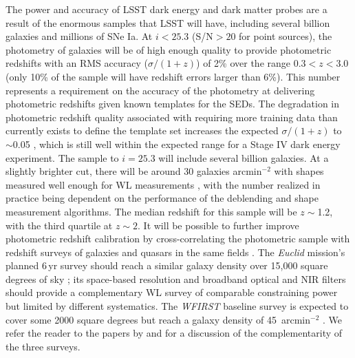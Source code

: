 The power and accuracy of LSST dark energy and dark matter probes are
a result of the enormous samples that LSST will have, including
several billion galaxies and millions of SNe Ia.
At $i < 25.3$ (S/N${}>20$ for point sources), the
photometry of galaxies will be of high enough quality to provide
photometric redshifts with an RMS accuracy ($\sigma/(1+z)$) of 2\%
over the range $0.3 < z < 3.0$ (only 10\% of the sample will have redshift errors larger than 6\%).
This number represents a requirement on the accuracy of the photometry at delivering photometric
redshifts given known templates for the SEDs.  The degradation in photometric redshift quality associated with
requiring more training data than currently exists to define the template set increases the
expected $\sigma/(1+z)$ to $\sim$0.05 \cite[e.g.][]{2015APh....63...81N,2018AJ....155....1G}, which is still well within the
expected range for a Stage IV dark energy experiment.  The
sample to $i=25.3$ will include several billion galaxies.  At a
slightly brighter cut, there will be around 30 galaxies arcmin$^{-2}$
with shapes measured well enough for WL measurements \citep{2013MNRAS.434.2121C,2015MNRAS.447.1746C},
with the number realized in practice being dependent on
the performance of the deblending and shape measurement algorithms.
The median redshift for
this sample will be $z\sim$1.2, with the third quartile at $z\sim2$.
It will be possible to further improve photometric redshift calibration
by cross-correlating the photometric sample with redshift surveys of
galaxies and quasars in the same fields
\citep{2008ApJ...684...88N,2010ApJ...721..456M,2013arXiv1303.4722M,2017arXiv171002517D}.
The \textit{Euclid} mission's planned 6\,yr survey should reach a similar galaxy
density over 15,000 square degrees of sky \citep{2011arXiv1110.3193L}; its space-based resolution
and broadband optical and NIR filters should provide a
complementary WL survey of comparable constraining power but
limited by different systematics.
The \textit{WFIRST} baseline survey is expected to cover some 2000 square degrees but reach a galaxy density of 45~arcmin$^{-2}$ \citep{2015arXiv150303757S}.
We refer the reader to the
papers by \citet{2015arXiv150107897J} and \citet{2017ApJS..233...21R} for a discussion of the complementarity of the three surveys.

